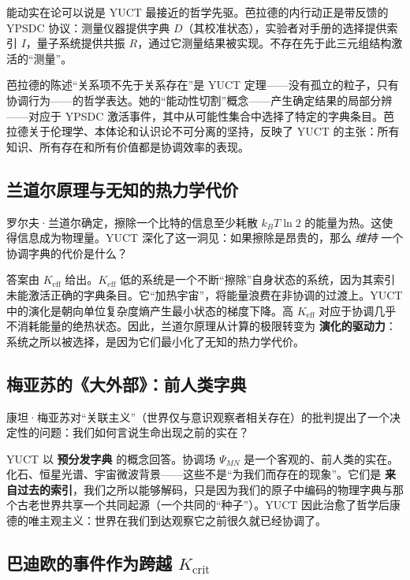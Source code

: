 \documentclass[12pt,a4paper]{article}
\newcommand{\Keff}{K_{\mathrm{eff}}}
\begin{document}
	能动实在论可以说是 YUCT 最接近的哲学先驱。芭拉德的内行动正是带反馈的 YPSDC 协议：测量仪器提供字典 \(D\)（其校准状态），实验者对手册的选择提供索引 \(I\)，量子系统提供共振 \(R\)，通过它测量结果被实现。不存在先于此三元组结构激活的“测量”。
	
	芭拉德的陈述“关系项不先于关系存在”是 YUCT 定理——没有孤立的粒子，只有协调行为——的哲学表达。她的“能动性切割”概念——产生确定结果的局部分辨——对应于 YPSDC 激活事件，其中从可能性集合中选择了特定的字典条目。芭拉德关于伦理学、本体论和认识论不可分离的坚持，反映了 YUCT 的主张：所有知识、所有存在和所有价值都是协调效率的表现。
	
	\subsection{兰道尔原理与无知的热力学代价}
	
	罗尔夫·兰道尔确定，擦除一个比特的信息至少耗散 \(k_B T \ln 2\) 的能量为热。这使得信息成为物理量。YUCT 深化了这一洞见：如果擦除是昂贵的，那么 \emph{维持} 一个协调字典的代价是什么？
	
	答案由 \(\Keff\) 给出。\(\Keff\) 低的系统是一个不断“擦除”自身状态的系统，因为其索引未能激活正确的字典条目。它“加热宇宙”，将能量浪费在非协调的过渡上。YUCT 中的演化是朝向单位复杂度熵产生最小状态的梯度下降。高 \(\Keff\) 对应于协调几乎不消耗能量的绝热状态。因此，兰道尔原理从计算的极限转变为 \textbf{演化的驱动力}：系统之所以被选择，是因为它们最小化了无知的热力学代价。
	
	\subsection{梅亚苏的《大外部》：前人类字典}
	
	康坦·梅亚苏对“关联主义”（世界仅与意识观察者相关存在）的批判提出了一个决定性的问题：我们如何言说生命出现之前的实在？
	
	YUCT 以 \textbf{预分发字典} 的概念回答。协调场 \(\Psi_{MN}\) 是一个客观的、前人类的实在。化石、恒星光谱、宇宙微波背景——这些不是“为我们而存在的现象”。它们是 \textbf{来自过去的索引}，我们之所以能够解码，只是因为我们的原子中编码的物理字典与那个古老世界共享一个共同起源（一个共同的“种子”）。YUCT 因此治愈了哲学后康德的唯主观主义：世界在我们到达观察它之前很久就已经协调了。
	
	\subsection{巴迪欧的事件作为跨越 \(K_{\mathrm{crit}}\)}
	
\end{document}
